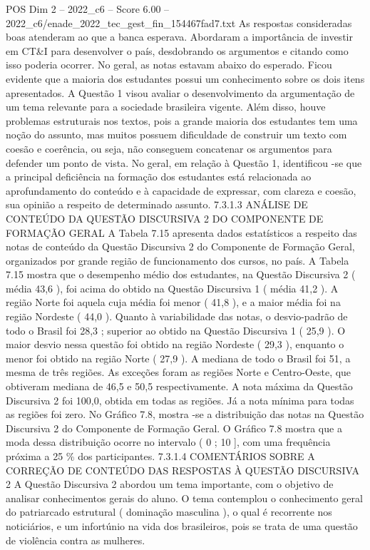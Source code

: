 \begin{textsample}{POS Dim 2 – 2022\_c6 – Score 6.00 – 2022\_c6/enade\_2022\_tec\_gest\_fin\_154467fad7.txt}
As respostas consideradas boas atenderam ao que a banca esperava.
Abordaram a importância de investir em CT\&I para desenvolver o país, desdobrando os argumentos e citando como isso poderia ocorrer.
No geral, as notas estavam abaixo do esperado.
Ficou evidente que a maioria dos estudantes possui um conhecimento sobre os dois itens apresentados.
A Questão 1 visou avaliar o desenvolvimento da argumentação de um tema relevante para a sociedade brasileira vigente.
Além disso, houve problemas estruturais nos textos, pois a grande maioria dos estudantes tem uma noção do assunto, mas muitos possuem dificuldade de construir um texto com coesão e coerência, ou seja, não conseguem concatenar os argumentos para defender um ponto de vista.
No geral, em relação à Questão 1, identificou -se que a principal deficiência na formação dos estudantes está relacionada ao aprofundamento do conteúdo e à capacidade de expressar, com clareza e coesão, sua opinião a respeito de determinado assunto. 7.3.1.3 ANÁLISE DE CONTEÚDO DA QUESTÃO DISCURSIVA 2 DO COMPONENTE DE FORMAÇÃO GERAL A Tabela 7.15 apresenta dados estatísticos a respeito das notas de conteúdo da Questão Discursiva 2 do Componente de Formação Geral, organizados por grande região de funcionamento dos cursos, no país.
A Tabela 7.15 mostra que o desempenho médio dos estudantes, na Questão Discursiva 2 ( média 43,6 ), foi acima do obtido na Questão Discursiva 1 ( média 41,2 ).
A região Norte foi aquela cuja média foi menor ( 41,8 ), e a maior média foi na região Nordeste ( 44,0 ).
Quanto à variabilidade das notas, o desvio-padrão de todo o Brasil foi 28,3 ; superior ao obtido na Questão Discursiva 1 ( 25,9 ).
O maior desvio nessa questão foi obtido na região Nordeste ( 29,3 ), enquanto o menor foi obtido na região Norte ( 27,9 ).
A mediana de todo o Brasil foi 51, a mesma de três regiões.
As exceções foram as regiões Norte e Centro-Oeste, que obtiveram mediana de 46,5 e 50,5 respectivamente.
A nota máxima da Questão Discursiva 2 foi 100,0, obtida em todas as regiões.
Já a nota mínima para todas as regiões foi zero.
No Gráfico 7.8, mostra -se a distribuição das notas na Questão Discursiva 2 do Componente de Formação Geral.
O Gráfico 7.8 mostra que a moda dessa distribuição ocorre no intervalo ( 0 ; 10 ], com uma frequência próxima a 25 \% dos participantes. 7.3.1.4 COMENTÁRIOS SOBRE A CORREÇÃO DE CONTEÚDO DAS RESPOSTAS À QUESTÃO DISCURSIVA 2 A Questão Discursiva 2 abordou um tema importante, com o objetivo de analisar conhecimentos gerais do aluno.
O tema contemplou o conhecimento geral do patriarcado estrutural ( dominação masculina ), o qual é recorrente nos noticiários, e um infortúnio na vida dos brasileiros, pois se trata de uma questão de violência contra as mulheres.

\end{textsample}
